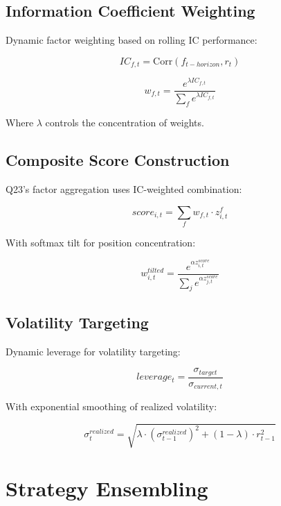 \documentclass[11pt,letterpaper]{book}
\newcommand{\Corr}{\mathrm{Corr}}
\begin{document}
\subsection{Information Coefficient Weighting}

Dynamic factor weighting based on rolling IC performance:

\begin{equation}
IC_{f,t} = \Corr(f_{t-horizon}, r_{t})
\end{equation}

\begin{equation}
w_{f,t} = \frac{e^{\lambda IC_{f,t}}}{\sum_f e^{\lambda IC_{f,t}}}
\end{equation}

Where $\lambda$ controls the concentration of weights.

\subsection{Composite Score Construction}

Q23's factor aggregation uses IC-weighted combination:

\begin{equation}
score_{i,t} = \sum_f w_{f,t} \cdot z_{i,t}^f
\end{equation}

With softmax tilt for position concentration:

\begin{equation}
w_{i,t}^{tilted} = \frac{e^{\alpha z_{i,t}^{score}}}{\sum_j e^{\alpha z_{j,t}^{score}}}
\end{equation}

\subsection{Volatility Targeting}

Dynamic leverage for volatility targeting:

\begin{equation}
leverage_t = \frac{\sigma_{target}}{\sigma_{current,t}}
\end{equation}

With exponential smoothing of realized volatility:

\begin{equation}
\sigma_{t}^{realized} = \sqrt{\lambda \cdot (\sigma_{t-1}^{realized})^2 + (1-\lambda) \cdot r_{t-1}^2}
\end{equation}

\section{Strategy Ensembling}
\end{document}
